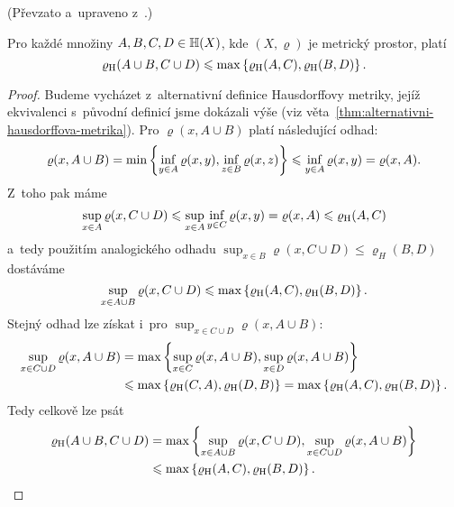 (Převzato a~upraveno z~\citep[str. 79]{Barnsley1993}.)
\begin{lemma}\label{lem:hausdorffova-metrika-odhad-sjednoceni}
    Pro každé množiny $A,B,C,D\in\mathbb{H}(X)$, kde $(X,\varrho)$ je metrický prostor, platí
    \[\varrho_\textup{H}(A\cup B,C\cup D)\leqslant\max\left\{\varrho_\textup{H}(A,C),\varrho_\textup{H}(B,D)\right\}.\]
\end{lemma}
\begin{proof}
    Budeme vycházet z~alternativní definice Hausdorffovy metriky, jejíž ekvivalenci s~původní definicí jsme dokázali výše (viz věta~\ref{thm:alternativni-hausdorffova-metrika}). Pro $\varrho(x,A\cup B)$ platí následující odhad:
    \[\varrho(x,A\cup B)=\min\left\{\inf_{y\in A}\varrho(x,y),\inf_{z\in B}\varrho(x,z)\right\}\leqslant\inf_{y\in A}\varrho(x,y)=\varrho(x,A).\]
    Z~toho pak máme
    \[\sup_{x\in A}\varrho(x,C\cup D)\leqslant\sup_{x\in A}\inf_{y\in C}\varrho(x,y)=\varrho(x,A)\leqslant\varrho_\textup{H}(A,C)\]
    a~tedy použitím analogického odhadu $\sup_{x\in B}\varrho(x,C\cup D)\leq \varrho_H(B,D)$ dostáváme
    \[\sup_{x\in A\cup B}\varrho(x,C\cup D)\leqslant\max\left\{\varrho_\textup{H}(A,C),\varrho_\textup{H}(B,D)\right\}.\]
    Stejný odhad lze získat i~pro $\sup_{x\in C\cup D}\varrho(x,A\cup B)$:
    \begin{align*}
        \sup_{x\in C\cup D}\varrho(x,A\cup B)&=\max\left\{\sup_{x\in C}\varrho(x,A\cup B),\sup_{x\in D}\varrho(x,A\cup B)\right\}\\
        &\leqslant\max\left\{\varrho_\textup{H}(C,A),\varrho_\textup{H}(D,B)\right\}=\max\left\{\varrho_\textup{H}(A,C),\varrho_\textup{H}(B,D)\right\}.
    \end{align*}
    Tedy celkově lze psát
    \begin{align*}
        \varrho_\textup{H}(A\cup B,C\cup D)&=\max\left\{\sup_{x\in A\cup B}\varrho(x,C\cup D),\sup_{x\in C\cup D}\varrho(x,A\cup B)\right\}\\
        &\leqslant\max\left\{\varrho_\textup{H}(A,C),\varrho_\textup{H}(B,D)\right\}.
    \end{align*}
\end{proof}

